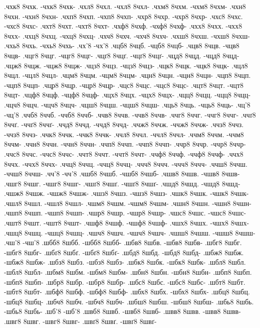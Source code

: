 {.чхк8 8чхк. -чхк8 8чхк-
.чхл8 8чхл. -чхл8 8чхл-
.чхм8 8чхм. -чхм8 8чхм-
.чхн8 8чхн. -чхн8 8чхн-
.чхп8 8чхп. -чхп8 8чхп-
.чхр8 8чхр. -чхр8 8чхр-
.чхс8 8чхс. -чхс8 8чхс-
.чхт8 8чхт. -чхт8 8чхт-
.чхф8 8чхф. -чхф8 8чхф-
.чхх8 8чхх. -чхх8 8чхх-
.чхц8 8чхц. -чхц8 8чхц-
.чхч8 8чхч. -чхч8 8чхч-
.чхш8 8чхш. -чхш8 8чхш-
.чхь8 8чхь. -чхь8 8чхь-
.чх'8 -чх'8
.чцб8 8чцб. -чцб8 8чцб-
.чцв8 8чцв. -чцв8 8чцв-
.чцг8 8чцг. -чцг8 8чцг-
.чцґ8 8чцґ. -чцґ8 8чцґ-
.чцд8 8чцд. -чцд8 8чцд-
.чцж8 8чцж. -чцж8 8чцж-
.чцз8 8чцз. -чцз8 8чцз-
.чцк8 8чцк. -чцк8 8чцк-
.чцл8 8чцл. -чцл8 8чцл-
.чцм8 8чцм. -чцм8 8чцм-
.чцн8 8чцн. -чцн8 8чцн-
.чцп8 8чцп. -чцп8 8чцп-
.чцр8 8чцр. -чцр8 8чцр-
.чцс8 8чцс. -чцс8 8чцс-
.чцт8 8чцт. -чцт8 8чцт-
.чцф8 8чцф. -чцф8 8чцф-
.чцх8 8чцх. -чцх8 8чцх-
.чцц8 8чцц. -чцц8 8чцц-
.чцч8 8чцч. -чцч8 8чцч-
.чцш8 8чцш. -чцш8 8чцш-
.чць8 8чць. -чць8 8чць-
.чц'8 -чц'8
.ччб8 8ччб. -ччб8 8ччб-
.ччв8 8ччв. -ччв8 8ччв-
.ччг8 8ччг. -ччг8 8ччг-
.ччґ8 8ччґ. -ччґ8 8ччґ-
.ччд8 8ччд. -ччд8 8ччд-
.ччж8 8ччж. -ччж8 8ччж-
.ччз8 8ччз. -ччз8 8ччз-
.ччк8 8ччк. -ччк8 8ччк-
.ччл8 8ччл. -ччл8 8ччл-
.ччм8 8ччм. -ччм8 8ччм-
.ччн8 8ччн. -ччн8 8ччн-
.ччп8 8ччп. -ччп8 8ччп-
.ччр8 8ччр. -ччр8 8ччр-
.ччс8 8ччс. -ччс8 8ччс-
.ччт8 8ччт. -ччт8 8ччт-
.ччф8 8ччф. -ччф8 8ччф-
.ччх8 8ччх. -ччх8 8ччх-
.ччц8 8ччц. -ччц8 8ччц-
.ччч8 8ччч. -ччч8 8ччч-
.ччш8 8ччш. -ччш8 8ччш-
.чч'8 -чч'8
.чшб8 8чшб. -чшб8 8чшб-
.чшв8 8чшв. -чшв8 8чшв-
.чшг8 8чшг. -чшг8 8чшг-
.чшґ8 8чшґ. -чшґ8 8чшґ-
.чшд8 8чшд. -чшд8 8чшд-
.чшж8 8чшж. -чшж8 8чшж-
.чшз8 8чшз. -чшз8 8чшз-
.чшк8 8чшк. -чшк8 8чшк-
.чшл8 8чшл. -чшл8 8чшл-
.чшм8 8чшм. -чшм8 8чшм-
.чшн8 8чшн. -чшн8 8чшн-
.чшп8 8чшп. -чшп8 8чшп-
.чшр8 8чшр. -чшр8 8чшр-
.чшс8 8чшс. -чшс8 8чшс-
.чшт8 8чшт. -чшт8 8чшт-
.чшф8 8чшф. -чшф8 8чшф-
.чшх8 8чшх. -чшх8 8чшх-
.чшц8 8чшц. -чшц8 8чшц-
.чшч8 8чшч. -чшч8 8чшч-
.чшш8 8чшш. -чшш8 8чшш-
.чш'8 -чш'8
.шбб8 8шбб. -шбб8 8шбб-
.шбв8 8шбв. -шбв8 8шбв-
.шбг8 8шбг. -шбг8 8шбг-
.шбґ8 8шбґ. -шбґ8 8шбґ-
.шбд8 8шбд. -шбд8 8шбд-
.шбж8 8шбж. -шбж8 8шбж-
.шбз8 8шбз. -шбз8 8шбз-
.шбк8 8шбк. -шбк8 8шбк-
.шбл8 8шбл. -шбл8 8шбл-
.шбм8 8шбм. -шбм8 8шбм-
.шбн8 8шбн. -шбн8 8шбн-
.шбп8 8шбп. -шбп8 8шбп-
.шбр8 8шбр. -шбр8 8шбр-
.шбс8 8шбс. -шбс8 8шбс-
.шбт8 8шбт. -шбт8 8шбт-
.шбф8 8шбф. -шбф8 8шбф-
.шбх8 8шбх. -шбх8 8шбх-
.шбц8 8шбц. -шбц8 8шбц-
.шбч8 8шбч. -шбч8 8шбч-
.шбш8 8шбш. -шбш8 8шбш-
.шбь8 8шбь. -шбь8 8шбь-
.шб'8 -шб'8
.швб8 8швб. -швб8 8швб-
.швв8 8швв. -швв8 8швв-
.швг8 8швг. -швг8 8швг-
.швґ8 8швґ. -швґ8 8швґ-
}
